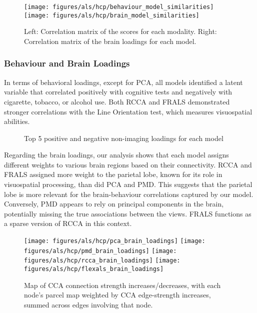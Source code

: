 \begin{figure}[h]
\centering
\texttt{[image: figures/als/hcp/behaviour\_model\_similarities]}
\texttt{[image: figures/als/hcp/brain\_model\_similarities]}
\caption{Left: Correlation matrix of the scores for each modality. Right: Correlation matrix of the brain loadings for each model.}
\label{fig:similarities}
\end{figure}


\subsubsection{Behaviour and Brain Loadings}
In terms of behavioral loadings, except for PCA, all models identified a latent variable that correlated positively with cognitive tests and negatively with cigarette, tobacco, or alcohol use.
Both RCCA and FRALS demonstrated stronger correlations with the Line Orientation test, which measures visuospatial abilities.

\begin{figure}[h]
\centering

\caption*{Top 5 positive and negative non-imaging loadings for each model}
\label{fig:behaviour}
\end{figure}

Regarding the brain loadings, our analysis shows that each model assigns different weights to various brain regions
based on their connectivity.
RCCA and FRALS assigned more weight to the parietal lobe, known for its role in visuospatial processing, than did PCA and PMD. This suggests that the parietal lobe is more relevant for the brain-behaviour correlations captured by our model.
Conversely, PMD appears to rely on principal components in the brain, potentially missing the true associations between the views.
FRALS functions as a sparse version of RCCA in this context.

\begin{figure}[h]
\centering
\texttt{[image: figures/als/hcp/pca\_brain\_loadings]}
\texttt{[image: figures/als/hcp/pmd\_brain\_loadings]}
\texttt{[image: figures/als/hcp/rcca\_brain\_loadings]}
\texttt{[image: figures/als/hcp/flexals\_brain\_loadings]}
\caption*{Map of CCA connection strength increases/decreases, with each node’s parcel map weighted by CCA edge-strength increases, summed across edges involving that node.}
\label{fig:brain}
\end{figure}

